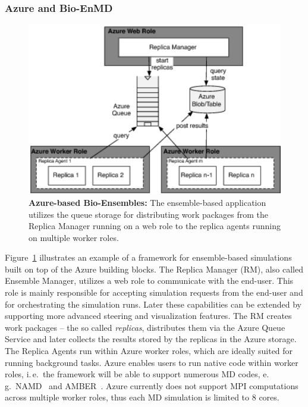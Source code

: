 \documentclass[graybox]{svmult}
\begin{document}
\subsubsection{Azure and Bio-EnMD}
\begin{figure}%
   \includegraphics[width=1.0\textwidth]{figures/re-azure-gray}
    \caption{\textbf{Azure-based Bio-Ensembles:} The ensemble-based
      application utilizes the queue storage for distributing work
      packages from the Replica Manager running on a web role to the
      replica agents running on multiple worker roles.}
    \label{fig:figures_re_azure}
\end{figure}
Figure~\ref{fig:figures_re_azure} illustrates an example of a
framework for ensemble-based simulations built on top of the Azure
building blocks. The Replica Manager (RM), also called Ensemble
Manager, utilizes a web role to communicate with the end-user. This
role is mainly responsible for accepting simulation requests from the
end-user and for orchestrating the simulation runs. Later these
capabilities can be extended by supporting more advanced steering and
visualization features. The RM creates work packages -- the so called
\emph{replicas}, distributes them via the Azure Queue Service and
later collects the results stored by the replicas in the Azure
storage.  The Replica Agents run within Azure worker roles, which are
ideally suited for running background tasks. Azure enables users to
run native code within worker roles, i.\,e.\ the framework will be
able to support numerous MD codes, e.\,g.\ NAMD~\cite{Phillips:2005gd}
and AMBER~\cite{cheatham-5}.  Azure currently does not support MPI
computations across multiple worker roles, thus each MD
simulation is limited to 8 cores.
\end{document}
